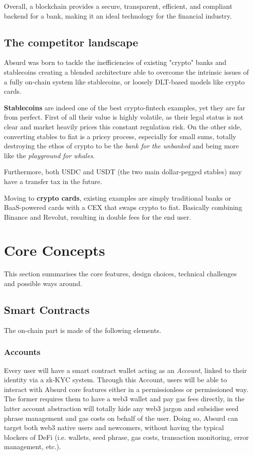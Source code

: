 \documentclass[a4paper,10 pt]{article}
\theoremstyle{definition}
\begin{document}
Overall, a blockchain provides a secure, transparent, efficient, and compliant backend for a bank, making it an ideal technology for the financial industry.

\subsection{The competitor landscape}
Absurd was born to tackle the inefficiencies of existing "crypto" banks and stablecoins creating a blended architecture able to overcome the intrinsic issues of a fully on-chain system like stablecoins, or loosely DLT-based models like crypto cards.

\textbf{Stablecoins} are indeed one of the best crypto-fintech examples, yet they are far from perfect. First of all their value is highly volatile, as their legal status is not clear and market heavily prices this constant regulation risk. On the other side, converting stables to fiat is a pricey process, especially for small sums, totally destroying the ethos of crypto to be the \textit{bank for the unbanked} and being more like the \textit{playground for whales}.

Furthermore, both USDC and USDT (the two main dollar-pegged stables) may have a transfer tax in the future.

Moving to \textbf{crypto cards}, existing examples are simply traditional banks or BaaS-powered cards with a CEX that swaps crypto to fiat. Basically combining Binance and Revolut, resulting in double fees for the end user.

\newpage

\section{Core Concepts}\label{core}
This section summarises the core features, design choices, technical challenges and possible ways around.

\subsection{Smart Contracts}
The on-chain part is made of the following elements.

\subsubsection{Accounts}\label{accountsSub}
Every user will have a smart contract wallet acting as an \textit{Account}, linked to their identity via a zk-KYC system. Through this Account, users will be able to interact with Absurd core features either in a permissionless or permissioned way. The former requires them to have a web3 wallet and pay gas fees directly, in the latter account abstraction will totally hide any web3 jargon and subsidise seed phrase management and gas costs on behalf of the user.
Doing so, Absurd can target both web3 native users and newcomers, without having the typical blockers of DeFi (i.e. wallets, seed phrase, gas costs, transaction monitoring, error management, etc.).
\end{document}
